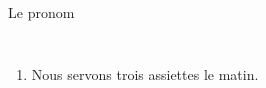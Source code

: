 \documentclass{beamer}
\begin{document}
\begin{frame}{Le pronom }
\begin{columns}[t]
\begin{enumerate}
            \item Nous \underline{  } servons \underline{\hspace{0.35cm}} trois \underline{\hspace{0.35cm}} assiettes \underline{\hspace{0.35cm}} le matin.
          \end{enumerate}
      \end{columns}
    \end{frame}
\end{document}
